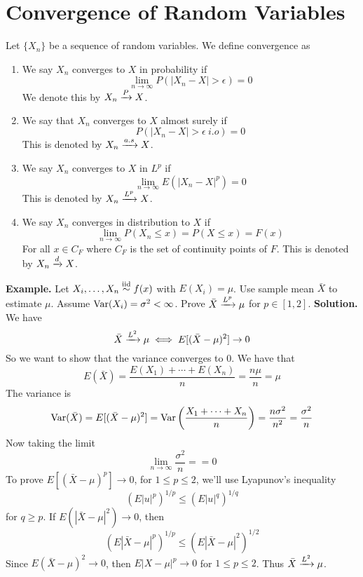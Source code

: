 \chapter{Convergence of Random Variables}
    \begin{definition}
        Let $\{X_n\}$ be a sequence of random variables. We define convergence as 
        \begin{enumerate}[label=(\roman*)]
            \item We say $X_n$ converges to $X$ in probability if 
            \[\lim_{n\rightarrow\infty}P(|X_n-X| > \epsilon) = 0\]
            We denote this by $X_n \xrightarrow{P} X$. 
            \item We say that $X_n$ converges to $X$ almost surely if 
            \[P(|X_n - X| > \epsilon \ i.o) = 0\]
            This is denoted by $X_n \xrightarrow{a.s} X$.
            \item We say $X_n$ converges to $X$ in $L^p$ if 
            \[\lim_{n\rightarrow\infty}E(|X_n-X|^p) = 0\]
            This is denoted by $X_n \xrightarrow{L^{p}} X$.
            \item We say $X_n$ converges in distribution to $X$ if 
            \[\lim_{n\rightarrow \infty}P(X_n \leq x) = P(X \leq x) = F(x)\]
            For all $x \in C_F$ where $C_F$ is the set of continuity points of $F$. This is denoted by $X_n \xrightarrow{d} X$. 
        \end{enumerate}
    \end{definition}
    \noindent
    \textbf{Example.} Let $X_i,\ldots, X_n \overset{\mathrm{iid}}{\sim} f(x)$ with $E(X_i) = \mu$. Use sample mean $\bar{X}$ to estimate $\mu$. Assume $\operatorname{Var}(X_i) = \sigma^2 < \infty$. Prove $\bar{X} \xrightarrow{L^{p}} \mu$ for $p \in [1,2]$.
    \textbf{Solution.}  
    We have
    \[\bar{X} \xrightarrow{L^{2}} \mu \iff E[(\bar{X} - \mu)^2] \rightarrow 0\]
    So we want to show that the variance converges to 0. We have that 
    \[E(\bar{X}) = \frac{E(X_1)+ \cdots + E(X_n)}{n} = \frac{n\mu}{n} = \mu\]
    The variance is 
    \[\operatorname{Var}(\bar{X}) = E[(\bar{X}-\mu)^2] = \operatorname{Var}\left(\frac{X_1 + \cdots + X_n}{n}\right) = \frac{n\sigma^2}{n^2} = \frac{\sigma^2}{n}\]
    Now taking the limit 
    \[\lim_{n\rightarrow \infty}\frac{\sigma^2}{n} = = 0\]
    To prove $E[(\bar{X} - \mu)^p] \rightarrow 0$, for $1 \leq p \leq 2$, we'll use Lyapunov's inequality
    \[(E|u|^p)^{1/p} \leq (E|u|^q)^{1/q}\]
    for $q \geq p$. If $E(|\bar{X}-\mu|^2) \rightarrow 0$, then 
    \[(E|\bar{X}-\mu|^p)^{1/p} \leq (E|\bar{X}-\mu|^2)^{1/2}\]
    Since $E(\bar{X} - \mu)^2 \rightarrow 0$, then $E|X - \mu|^p \rightarrow 0$ for $1 \leq p \leq 2$. Thus $\bar{X} \xrightarrow{L^{2}} \mu$. 
    


